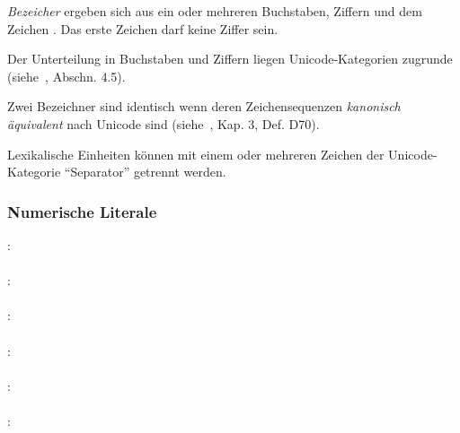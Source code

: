 \emph{Bezeicher} ergeben sich aus ein oder mehreren Buchstaben, Ziffern und dem Zeichen \Gt{\_}. Das erste Zeichen
darf keine Ziffer sein.

Der Unterteilung in Buchstaben und Ziffern liegen Unicode-Kategorien zugrunde (siehe~\cite{unicode}, Abschn. 4.5).

Zwei Bezeichner sind identisch wenn deren Zeichensequenzen \emph{kanonisch äquivalent} nach Unicode sind (siehe~\cite{unicode}, Kap. 3, Def. D70).

Lexikalische Einheiten können mit einem oder mehreren Zeichen der Unicode-Kategorie "`Separator"' getrennt werden.


\subsubsection{Numerische Literale}\label{Numerische Literale}
:\label{Numbers}\\
\hspace*{1cm}\Gspace{}\\
:\label{Numbers_Sign}\\
\hspace*{1cm}\Gopt{\Gt{-}}\Gspace{}\\
:\label{Numbers_Frac}\\
\hspace*{1cm}\Gspace{}\\
:\label{Num_Float_Exp}\\
\hspace*{1cm}\Gspace{}\\
:\label{Num_Float}\\
\hspace*{1cm}\Gspace{}\\
:\label{Digit_Hex}\\
\hspace*{1cm}\\
